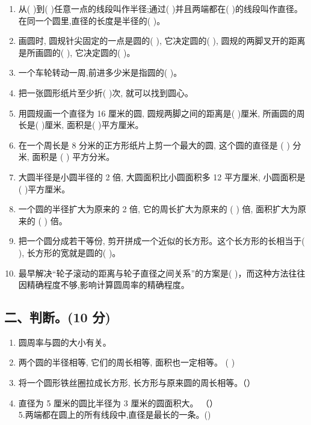 \documentclass[
  10
]{article}
\providecommand{\tightlist}{%
  \setlength{\itemsep}{0pt}\setlength{\parskip}{0pt}}
\begin{document}
\begin{enumerate}
\def\labelenumi{\arabic{enumi}.}
\tightlist
\item
  从( )到( )任意一点的线段叫作半径;通过( )并且两端都在(
  )的线段叫作直径。在同一个圆里,直径的长度是半径的( )。\\
\item
  画圆时, 圆规针尖固定的一点是圆的( ), 它决定圆的( ),
  圆规的两脚叉开的距离是所画圆的( ), 它决定圆的( )。\\
\item
  一个车轮转动一周,前进多少米是指圆的( )。\\
\item
  把一张圆形纸片至少折( )次, 就可以找到圆心。\\
\item
  用圆规画一个直径为 16 厘米的圆, 圆规两脚之间的距离是( )厘米,
  所画圆的周长是( )厘米, 面积是( )平方厘米。\\
\item
  在一个周长是 8 分米的正方形纸片上剪一个最大的圆, 这个圆的直径是 ( )
  分米, 面积是 ( ) 平方分米。\\
\item
  大圆半径是小圆半径的 2 倍, 大圆面积比小圆面积多 12 平方厘米,
  小圆面积是( )平方厘米。\\
\item
  一个圆的半径扩大为原来的 2 倍, 它的周长扩大为原来的 ( ) 倍,
  面积扩大为原来的 ( ) 倍。\\
\item
  把一个圆分成若干等份, 剪开拼成一个近似的长方形。这个长方形的长相当于(
  ), 长方形的宽就是圆的( )。\\
\item
  最早解决``轮子滚动的距离与轮子直径之间关系''的方案是(
  )，而这种方法往往因精确程度不够,影响计算圆周率的精确程度。
\end{enumerate}

\subsection{二、判断。(10 分)}\label{ux4e8cux5224ux65ad10-ux5206}

\begin{enumerate}
\def\labelenumi{\arabic{enumi}.}
\item
  圆周率与圆的大小有关。\\
\item
  两个圆的半径相等, 它们的周长相等, 面积也一定相等。 ( )
\item
  将一个圆形铁丝圈拉成长方形, 长方形与原来圆的周长相等。（）\\
\item
  直径为 5 厘米的圆比半径为 3 厘米的圆面积大。 （）\\
  5.两端都在圆上的所有线段中,直径是最长的一条。()
\end{enumerate}
\end{document}
